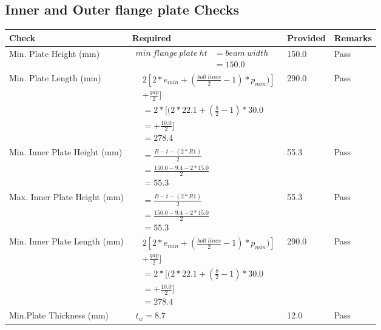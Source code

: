 \documentclass{article}%
\begin{document}
%
\newpage%
\subsection{Inner and Outer flange plate Checks}%
\label{subsec:InnerandOuterflangeplateChecks}%
\renewcommand{\arraystretch}{1.2}%
\begin{longtable}{|p{4cm}|p{6cm}|p{5.5cm}|p{1.5cm}|}%
\hline%
\rowcolor{OsdagGreen}%
Check&Required&Provided&Remarks\\%
\hline%
\endhead%
\hline%
Min. Plate Height (mm)&$\begin{aligned}min~flange~plate~ht &= beam~width\\ &=150.0\end{aligned}$&150.0&Pass\\%
\hline%
Min. Plate Length (mm)&$\begin{aligned} & 2[2*e_{min} + ({\frac{bolt~lines}{2}}-1) * p_{min})]\\ & +\frac{gap}{2}]\\ &=2*[(2*22.1 + (\frac{8}{2}-1) * 30.0\\ &= + \frac{10.0}{2}]\\ &=278.4\end{aligned}$&290.0&Pass\\%
\hline%
Min. Inner Plate Height (mm)&$\begin{aligned}&= \frac{B -t- (2*R1)}{2}\\ &=\frac{150.0 -9.4 - 2*15.0}{2}\\ &=55.3\end{aligned}$&55.3&Pass\\%
\hline%
Max. Inner Plate Height (mm)&$\begin{aligned}&= \frac{B -t- (2*R1)}{2}\\ &=\frac{150.0 -9.4 - 2*15.0}{2}\\ &=55.3\end{aligned}$&55.3&Pass\\%
\hline%
Min. Inner Plate Length (mm)&$\begin{aligned} & 2[2*e_{min} + ({\frac{bolt~lines}{2}}-1) * p_{min})]\\ & +\frac{gap}{2}]\\ &=2*[(2*22.1 + (\frac{8}{2}-1) * 30.0\\ &= + \frac{10.0}{2}]\\ &=278.4\end{aligned}$&290.0&Pass\\%
\hline%
Min.Plate Thickness (mm)&$\begin{aligned} t_w=8.7\end{aligned}$&12.0&Pass\\%
\hline%
\end{longtable}
\end{document}
